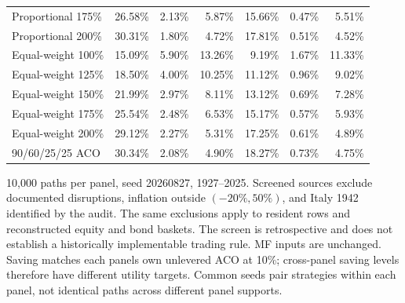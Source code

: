 \begin{table}[p]
{\begin{tabular}{lrrrrrr}
Proportional 175\% & 26.58\% & 2.13\% & 5.87\% & 15.66\% & 0.47\% & 5.51\% \\
Proportional 200\% & 30.31\% & 1.80\% & 4.72\% & 17.81\% & 0.51\% & 4.52\% \\
Equal-weight 100\% & 15.09\% & 5.90\% & 13.26\% & 9.19\% & 1.67\% & 11.33\% \\
Equal-weight 125\% & 18.50\% & 4.00\% & 10.25\% & 11.12\% & 0.96\% & 9.02\% \\
Equal-weight 150\% & 21.99\% & 2.97\% & 8.11\% & 13.12\% & 0.69\% & 7.28\% \\
Equal-weight 175\% & 25.54\% & 2.48\% & 6.53\% & 15.17\% & 0.57\% & 5.93\% \\
Equal-weight 200\% & 29.12\% & 2.27\% & 5.31\% & 17.25\% & 0.61\% & 4.89\% \\
90/60/25/25 ACO & 30.34\% & 2.08\% & 4.90\% & 18.27\% & 0.73\% & 4.75\% \\
\bottomrule\end{tabular}}
\par\smallskip\begin{minipage}{0.97\textwidth}\footnotesize 10,000 paths per panel, seed 20260827, 1927--2025. Screened sources exclude documented disruptions, inflation outside $(-20\%,50\%)$, and Italy 1942 identified by the audit. The same exclusions apply to resident rows and reconstructed equity and bond baskets. The screen is retrospective and does not establish a historically implementable trading rule. MF inputs are unchanged. Saving matches each panel\textquotesingle s own unlevered ACO at 10\%; cross-panel saving levels therefore have different utility targets. Common seeds pair strategies within each panel, not identical paths across different panel supports.\end{minipage}\end{table}
